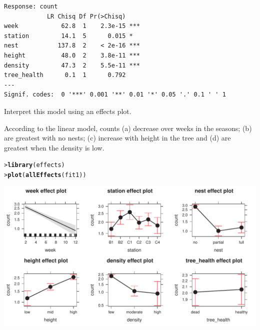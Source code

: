 \documentclass[10pt]{report}\usepackage[]{graphicx}\usepackage[]{color}
\makeatletter
\newcommand{\hlstd}[1]{\textcolor[rgb]{0.345,0.345,0.345}{#1}}%
\newcommand{\hlkwd}[1]{\textcolor[rgb]{0.737,0.353,0.396}{\textbf{#1}}}%
\newenvironment{kframe}{%
 \def\at@end@of@kframe{}%
 \ifinner\ifhmode%
  \def\at@end@of@kframe{\end{minipage}}%
  \begin{minipage}{\columnwidth}%
 \fi\fi%
 \def\FrameCommand##1{\hskip\@totalleftmargin \hskip-\fboxsep
 \colorbox{shadecolor}{##1}\hskip-\fboxsep
     \hskip-\linewidth \hskip-\@totalleftmargin \hskip\columnwidth}%
 \MakeFramed {\advance\hsize-\width
   \@totalleftmargin\z@ \linewidth\hsize
   \@setminipage}}%
 {\par\unskip\endMakeFramed%
 \at@end@of@kframe}
\newenvironment{knitrout}{}{} %
\renewenvironment{knitrout}{\small\renewcommand{\baselinestretch}{.85}}{} %
\makeatother
\begin{document}
\begin{Exercises}
\begin{enumerate*}
\begin{ans}
\begin{knitrout}
\begin{kframe}
\begin{verbatim}
Response: count
            LR Chisq Df Pr(>Chisq)    
week            62.8  1    2.3e-15 ***
station         14.1  5      0.015 *  
nest           137.8  2    < 2e-16 ***
height          48.0  2    3.8e-11 ***
density         47.3  2    5.5e-11 ***
tree_health      0.1  1      0.792    
---
Signif. codes:  0 '***' 0.001 '**' 0.01 '*' 0.05 '.' 0.1 ' ' 1
\end{verbatim}
\end{kframe}
\end{knitrout}
		\end{ans}
		
		\item Interpret this model using an effects plot.
		\begin{ans}
		According to the linear model, counts (a) decrease over weeks in the seasons; (b)
		are greatest with no nests; (c) increase with height in the tree and
		(d) are greatest when the density is low.
\begin{knitrout}\footnotesize
{}\color{fgcolor}\begin{kframe}
\begin{alltt}
\hlstd{> }\hlkwd{library}\hlstd{(effects)}
\hlstd{> }\hlkwd{plot}\hlstd{(}\hlkwd{allEffects}\hlstd{(fit1))}
\end{alltt}
\end{kframe}

\centerline{\includegraphics[width=.75\textwidth]{soln/fig/ex11_4c-1} }



\end{knitrout}
		\end{ans}
		

\end{enumerate*}
\end{Exercises}
\end{document}
